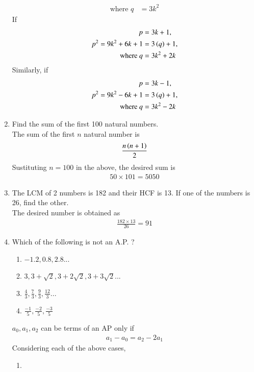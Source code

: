 \documentclass[journal,12pt,twocolumn]{IEEEtran}
\renewcommand\thesection{\arabic{section}}
\begin{document}
\begin{enumerate}[label=\thesection.\arabic*.,ref=\thesection.\theenumi]
\begin{align}
		    \\
		    \text{where } q &= 3k^2
	    \end{align}
	    If 
	    \begin{align}
		    p &= 3k+1, 
		    \\
		    p^2 = 9k^2 + 6k + 1&= 3\left(q\right)+1, 
		    \\
		    \text{where } q &= 3k^2+2k
	    \end{align}
	    Similarly, if
	    \begin{align}
		    p &= 3k-1, 
		    \\
		    p^2 = 9k^2 - 6k + 1&= 3\left(q\right)+1, 
		    \\
		    \text{where } q &= 3k^2-2k
	    \end{align}
\item Find the sum of the first 100 natural numbers.\\
	\solution The sum of the first $n$ natural number is 
  \begin{align}
	  \frac{n\left(n+1\right)}{2}
  \end{align}
Sustituting $n = 100$ in the above, the desired sum is 
  \begin{align}
50 \times 101 = 5050	
  \end{align}
\item The LCM of 2 numbers is 182 and their HCF is 13. If one of the numbers is 26, find the other.\\
\solution The desired number is obtained as
  \begin{align}
	  \frac{182 \times 13}{26} = 91
  \end{align}
\item Which of the following is not an A.P. ?
\begin{enumerate}
    \item $-1.2, 0.8, 2.8...$
    \item $3, 3 + \sqrt{2}, 3 + 2\sqrt{2},3 + 3\sqrt{2}...$
    \item $\frac{4}{3}, \frac{7}{3}, \frac{9}{3}, \frac{12}{3}...$
    \item $\frac{-1}{5}, \frac{-2}{5}, \frac{-3}{5}$
\end{enumerate}
\solution $a_0, a_1, a_2$ can be terms of an AP only if 
		\begin{align}
	a_1 - 	a_0 = a_2 - 2a_1
		\end{align}
		Considering each of the above cases, 
		\begin{enumerate}
			\item 
				\begin{align}

\end{align}
\end{enumerate}
\end{enumerate}
\end{document}

